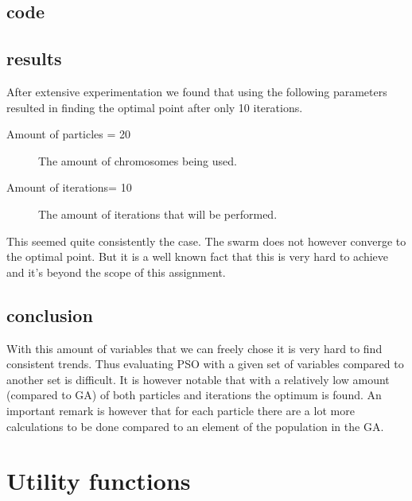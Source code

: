\documentclass[11pt,a4paper,oneside]{article}
\begin{document}
\subsection{code}


\subsection{results}
After extensive experimentation we found that using the following parameters resulted in finding the optimal point after only 10 iterations. 
\begin{description}
		\item[Amount of particles = 20] The amount of chromosomes being used.
		\item[Amount of iterations= 10] The amount of iterations that will be performed.
\end{description}

This seemed quite consistently the case.
The swarm does not however converge to the optimal point.
But it is a well known fact that this is very hard to achieve and it's beyond the scope of this assignment.

\subsection{conclusion}
With this amount of variables that we can freely chose it is very hard to find consistent trends. Thus evaluating PSO with a given set of variables compared to another set is difficult. It is however notable that with a relatively low amount (compared to GA) of both particles and iterations the optimum is found. An important remark is however that for each particle there are a lot more calculations to be done compared to an element of the population in the GA.
\appendix
\section{Utility functions}



\end{document}
